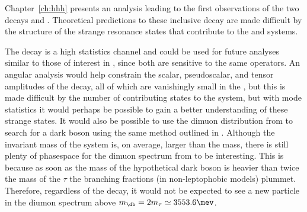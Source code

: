 








Chapter~\ref{ch:hhh} presents an analysis leading to the first observations of the two decays
\btokpipimumu and \btophikmumu.
Theoretical predictions to these inclusive decay are made difficult by the structure of the strange
resonance states that contribute to the \kpipi and \phik systems.

The decay \btokpipimumu is a high statistics channel and could be used for future analyses similar to
those of interest in \btokstrmumu, since both are sensitive to the same operators.
An angular analysis would help constrain the scalar, pseudoscalar, and tensor amplitudes of the
decay, all of which are vanishingly small in the \sm, but this is made difficult by the number of
contributing states to the \kpipi system,
but with mode statistics it would perhaps be possible to gain a better understanding of these
strange states.
It would also be possible to use the dimuon distribution from \btokpipimumu to search for a dark
boson using the same method outlined in .
Although the invariant mass of the \kpipi system is, on average, larger than the \Kstarz mass,
there is still plenty of phasespace for the dimuon spectrum from \btokpipimumu to be interesting.
This is because as soon as the mass of the hypothetical dark boson is heavier than twice the mass
of the $\tau$ the branching fractions (in non-leptophobic models) plummet.
Therefore, regardless of the decay, it would not be expected to see a new particle in the diumon
spectrum above $m_\db=2m_\tau\simeq3553.6\mev$.

